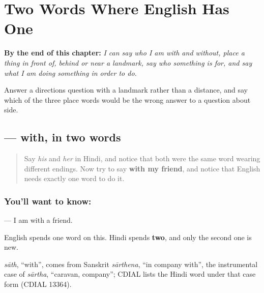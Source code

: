 
\chapter{Two Words Where English Has One}
\label{ch:hi-sambandh}

\begin{chapteropening}
\textbf{By the end of this chapter:} \emph{I can say who I am with and without, place a thing in front of, behind or near a landmark, say who something is for, and say what I am doing something in order to do.}

Answer a directions question with a landmark rather than a distance, and say which of the three place words would be the wrong answer to a question about side.
\end{chapteropening}

\section[\texorpdfstring{\hi{के} \hi{साथ} (ke sāth)}{के साथ (ke sāth)}]{  — with, in two words}

\label{lesson:HI-C93-ke-saath}



\begin{quote}
Say \emph{his} and \emph{her} in Hindi, and notice that both were the same word wearing different endings. Now try to say \textbf{with my friend}, and notice that English needs exactly one word to do it.
\end{quote}

\subsection*{You'll want to know:  }
\textbf{    } — I am with a friend.

English spends one word on this. Hindi spends \textbf{two}, and only the second one is new.

\begin{cousinweb}
\emph{sāth}, \textquotedblleft{}with\textquotedblright{}, comes from Sanskrit \emph{sārthena}, \textquotedblleft{}in company with\textquotedblright{}, the instrumental case of \emph{sārtha}, \textquotedblleft{}caravan, company\textquotedblright{}; CDIAL lists the Hindi word under that case form (CDIAL 13364).
\end{cousinweb}

